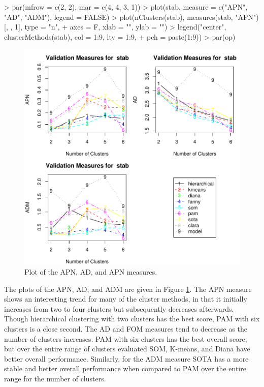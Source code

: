 \documentclass[11pt]{article}
\begin{document}



\begin{Schunk}
\begin{Sinput}
> par(mfrow = c(2, 2), mar = c(4, 4, 3, 1))
> plot(stab, measure = c("APN", "AD", "ADM"), legend = FALSE)
> plot(nClusters(stab), measures(stab, "APN")[, , 1], type = "n", 
+     axes = F, xlab = "", ylab = "")
> legend("center", clusterMethods(stab), col = 1:9, lty = 1:9, 
+     pch = paste(1:9))
> par(op)
\end{Sinput}
\end{Schunk}

\begin{figure}
  \centering
\includegraphics{clValid-010}
  \caption{Plot of the APN, AD, and APN  measures.}
  \label{fig:stabPlot}
\end{figure}



The plots of the APN, AD, and ADM are given in Figure
\ref{fig:stabPlot}.
The APN measure shows an interesting
trend for many of the cluster methods, in that it initially increases
from two to four clusters but subsequently decreases afterwards.  
Though hierarchical clustering with two clusters has the best score,
PAM with six clusters is a close second.
The AD and FOM measures tend to decrease as the number of clusters
increases.  PAM with six clusters has the best overall score,
but over the entire range of clusters evaluated SOM,
K-means, and Diana have better overall performance.  
Similarly, for the ADM measure SOTA has a more stable and better
overall performance when compared to PAM over the entire range for the
number of clusters.  
\end{document}
